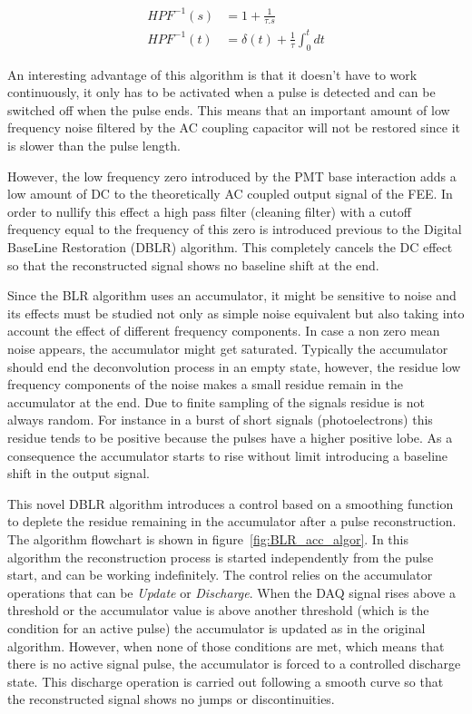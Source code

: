 \documentclass[a4paper, 10pt, oneside, twocolumn, 3p]{elsarticle}
\begin{document}
\begin{align}
HPF^{-1}(s)&=1+\frac{1}{\tau.s} \\
HPF^{-1}(t)&=\delta(t)+\frac{1}{\tau} \int_{0}^{t} dt
\label{eq:imp}
\end{align}
   
\par An interesting advantage of this algorithm is that it doesn't have to work continuously, it only has to be activated when a pulse is detected and can be switched off when the pulse ends. This means that an important amount of low frequency noise filtered by the AC coupling capacitor will not be restored since it is slower than the pulse length.

\par However, the low frequency zero introduced by the PMT base interaction adds a low amount of DC to the theoretically AC coupled output signal of the FEE. In order to nullify this effect a high pass filter (cleaning filter) with a cutoff frequency equal to the frequency of this zero is introduced previous to the Digital BaseLine Restoration (DBLR) algorithm. This completely cancels the DC effect so that the reconstructed signal shows no baseline shift at the end. 

\par Since the BLR algorithm uses an accumulator, it might be sensitive to noise and its effects must be studied not only as simple noise equivalent but also taking into account the effect of different frequency components. In case a non zero mean noise appears, the accumulator might get saturated. Typically the accumulator should end the deconvolution process in an empty state, however, the residue low frequency components of the noise makes a small residue remain in the accumulator at the end. Due to finite sampling of the signals residue is not always random. For instance in a burst of short signals (photoelectrons) this residue tends to be positive because the pulses have a higher positive lobe. As a consequence the accumulator starts to rise without limit introducing a baseline shift in the output signal.

\par This novel DBLR algorithm introduces a control based on a smoothing function to deplete the residue remaining in the accumulator after a pulse reconstruction. The algorithm flowchart is shown in figure~\ref{fig:BLR_acc_algor}. In this algorithm the reconstruction process is started independently from the pulse start, and can be working indefinitely. The control relies on the accumulator operations that can be \emph{Update} or \emph{Discharge}. When the DAQ signal rises above a  threshold or the accumulator value is above another threshold (which is the condition for an active pulse) the accumulator is updated as in the original algorithm. However, when none of those conditions are met, which means that there is no active signal pulse, the accumulator is forced to a controlled discharge state. This discharge operation is carried out following a smooth curve so that the reconstructed signal shows no jumps or discontinuities.
\end{document}
